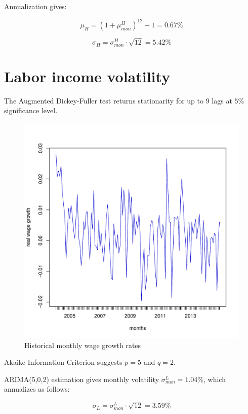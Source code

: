Annualization gives:

\begin{equation}
	\mu_H = (1 + \mu^H_{mon})^{12} - 1= 0.67\%
\end{equation}

\begin{equation}
	\sigma_H = \sigma^H_{mon} \cdot \sqrt{12} = 5.42 \%
\end{equation}


\section{Labor income volatility}
\label{paramcalibz}
The Augmented Dickey-Fuller test returns stationarity for up to 9 lags at $5\%$ significance level. 

\begin{figure}[h!]
	\centering
	\includegraphics[scale=0.3]{figs/wagediff.pdf}
	\caption{Historical monthly wage growth rates}
	\label{fig:wagediff}
\end{figure}

Akaike Information Criterion suggests $p=5$ and $q=2$.

ARIMA(5,0,2) estimation gives monthly volatility $\sigma^L_{mon} = 1.04\%$, which annualizes as follows:

\begin{equation}
	\sigma_L = \sigma^L_{mon} \cdot \sqrt{12} = 3.59 \%
\end{equation}


